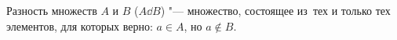 
    Разность множеств $A$ и $B$ ($A\dd B$) "--- множество, состоящее из~тех и только тех элементов, для которых верно: $a\in A$, но $a\notin B$.



